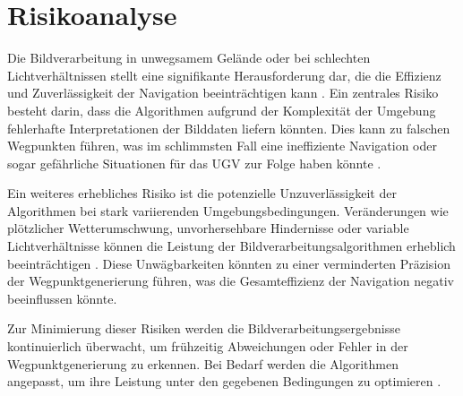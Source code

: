 \section{Risikoanalyse}

Die Bildverarbeitung in unwegsamem Gelände oder bei schlechten Lichtverhältnissen stellt eine signifikante Herausforderung dar, die die Effizienz und Zuverlässigkeit der Navigation beeinträchtigen kann \cite{mapless:ugv:navigation}. 
Ein zentrales Risiko besteht darin, dass die Algorithmen aufgrund der Komplexität der Umgebung fehlerhafte Interpretationen der Bilddaten liefern könnten. 
Dies kann zu falschen Wegpunkten führen, was im schlimmsten Fall eine ineffiziente Navigation oder sogar gefährliche Situationen für das \ac{UGV} zur Folge haben könnte \cite{ugv:coverage:energy:efficient}.
    
Ein weiteres erhebliches Risiko ist die potenzielle Unzuverlässigkeit der Algorithmen bei stark variierenden Umgebungsbedingungen. Veränderungen wie plötzlicher Wetterumschwung, unvorhersehbare Hindernisse oder variable Lichtverhältnisse können die Leistung der Bildverarbeitungsalgorithmen erheblich beeinträchtigen \cite{autonomous:flight:uwb:positioning}. 
Diese Unwägbarkeiten könnten zu einer verminderten Präzision der Wegpunktgenerierung führen, was die Gesamteffizienz der Navigation negativ beeinflussen könnte.

Zur Minimierung dieser Risiken werden die Bildverarbeitungsergebnisse kontinuierlich überwacht, um frühzeitig Abweichungen oder Fehler in der Wegpunktgenerierung zu erkennen. 
Bei Bedarf werden die Algorithmen angepasst, um ihre Leistung unter den gegebenen Bedingungen zu optimieren \cite{image:processing:uav:autonomous}.
